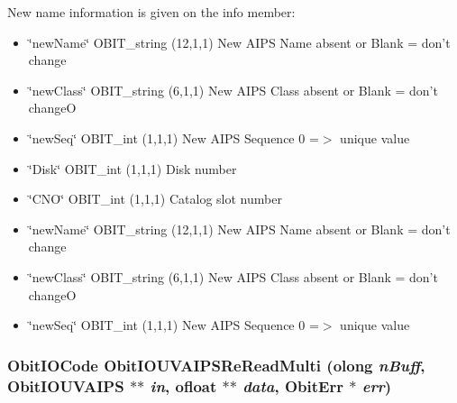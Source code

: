 New name information is given on the info member: \begin{itemize}
\item \char`\"{}new\-Name\char`\"{} OBIT\_\-string (12,1,1) New AIPS Name absent or Blank = don't change \item \char`\"{}new\-Class\char`\"{} OBIT\_\-string (6,1,1) New AIPS Class absent or Blank = don't change\-O \item \char`\"{}new\-Seq\char`\"{} OBIT\_\-int (1,1,1) New AIPS Sequence 0 =$>$ unique value 
\item \char`\"{}Disk\char`\"{} OBIT\_\-int (1,1,1) Disk number \item \char`\"{}CNO\char`\"{} OBIT\_\-int (1,1,1) Catalog slot number \item \char`\"{}new\-Name\char`\"{} OBIT\_\-string (12,1,1) New AIPS Name absent or Blank = don't change \item \char`\"{}new\-Class\char`\"{} OBIT\_\-string (6,1,1) New AIPS Class absent or Blank = don't change\-O \item \char`\"{}new\-Seq\char`\"{} OBIT\_\-int (1,1,1) New AIPS Sequence 0 =$>$ unique value 
\end{itemize}
\subsubsection{\setlength{\rightskip}{0pt plus 5cm}Obit\-IOCode Obit\-IOUVAIPSRe\-Read\-Multi ({\bf olong} {\em n\-Buff}, {\bf Obit\-IOUVAIPS} $\ast$$\ast$ {\em in}, {\bf ofloat} $\ast$$\ast$ {\em data}, {\bf Obit\-Err} $\ast$ {\em err})}\label{ObitIOUVAIPS_8c_a22}



